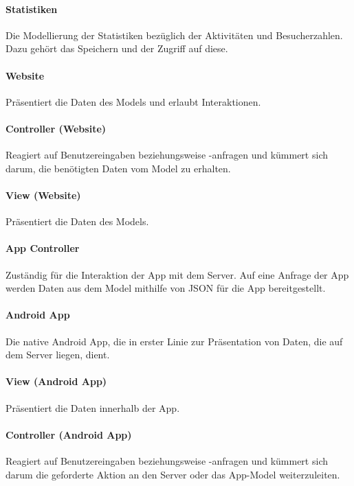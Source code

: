 \paragraph{Statistiken} Die Modellierung der Statistiken bezüglich der Aktivitäten und Besucherzahlen. Dazu gehört das Speichern und der Zugriff auf diese.

\paragraph{Website} Präsentiert die Daten des Models und erlaubt Interaktionen.

\paragraph{Controller (Website)} Reagiert auf Benutzereingaben beziehungsweise -anfragen und kümmert sich darum, die benötigten Daten vom Model zu erhalten.

\paragraph{View (Website)} Präsentiert die Daten des Models.

\paragraph{App Controller} Zuständig für die Interaktion der App mit dem Server. Auf eine Anfrage der App werden Daten aus dem Model mithilfe von JSON für die App bereitgestellt.

\paragraph{Android App} Die native Android App, die in erster Linie zur Präsentation von Daten, die auf dem Server liegen, dient.

\paragraph{View (Android App)} Präsentiert die Daten innerhalb der App.

\paragraph{Controller (Android App)} Reagiert auf Benutzereingaben beziehungsweise -anfragen und kümmert sich darum die geforderte Aktion an den Server oder das App-Model weiterzuleiten.

